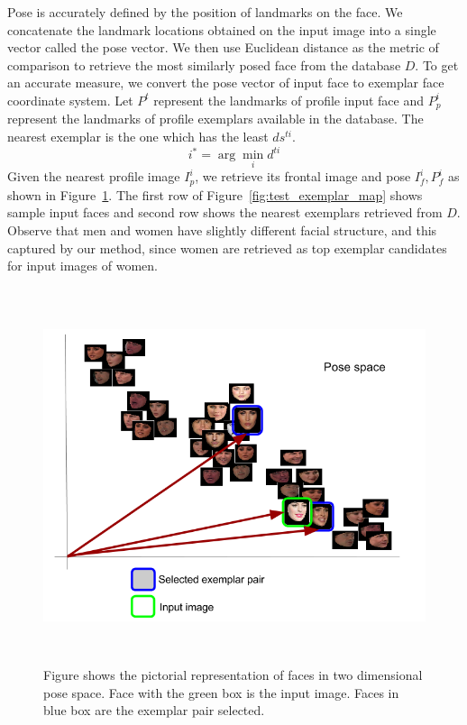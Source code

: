 Pose is accurately defined by the position of landmarks on the face. We concatenate the landmark
locations obtained on the input image into a single vector called  the
pose vector. We then use Euclidean distance as the metric of comparison to retrieve the most
similarly posed face from the database $D$. To get an accurate measure, we convert the pose vector of input face to
exemplar face coordinate system. Let $P^t$ represent the landmarks of profile
input face and $P_p^i$ represent the landmarks of profile exemplars available in the database. 
The nearest exemplar is the one which has the least $ds^{ti}$. 
\begin{equation}
  i^* = \arg \min_{i} d^{ti}
\end{equation}
Given the nearest profile image $I_p^i$, we retrieve its frontal image and pose $I_f^i, P_f^i$ as shown in Figure~\ref{fig:face_space}.
The first row of Figure~\ref{fig:test_exemplar_map} shows sample input faces and second row shows the
nearest exemplars retrieved from $D$. Observe that men and women have slightly different facial
structure, and this captured by our method, since women are retrieved as top exemplar candidates for
input images of women. 

\begin{figure}
\centering
\includegraphics[width =14cm,height=11cm]{front/figures/face_space.png}
\caption{Figure shows the pictorial representation of faces in two dimensional pose space. Face with 
the green box is the input image. Faces in blue box are the exemplar pair selected.}
\label{fig:face_space}
\end{figure}
